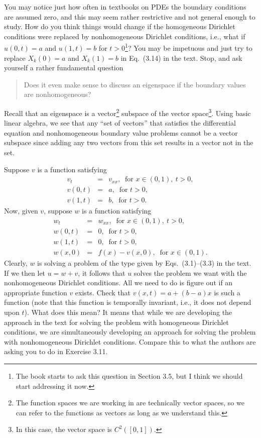 \documentclass{amsart}
\theoremstyle{plain}
\theoremstyle{definition}
\theoremstyle{remark}
\theoremstyle{definition}
\numberwithin{equation}{section}
\numberwithin{equation}{section}
\begin{document}
You may notice just how often in textbooks on PDEs the boundary conditions are assumed zero, and this may seem rather restrictive and not general enough to study.
How do you think things would change if the homogeneous Dirichlet conditions were replaced by nonhomogeneous Dirichlet conditions, i.e., what if $u(0,t)=a$ and $u(1,t)=b$ for $t>0$\footnote{The book starts to ask this question in Section 3.5, but I think we should start addressing it now.}?
You may be impetuous and just try to replace $X_k(0)=a$ and $X_k(1)=b$ in Eq.~(3.14) in the text.
Stop, and ask yourself a rather fundamental question
\begin{quote}
Does it even make sense to discuss an eigenspace if the boundary values are nonhomogeneous?
\end{quote}
Recall that an eigenspace is a vector\footnote{The function spaces we are working in are technically vector spaces, so we can refer to the functions as vectors as long as we understand this.} subspace of the vector space\footnote{In this case, the vector space is $C^2([0,1])$.}. 
Using basic linear algebra, we see that any ``set of vectors'' that satisfies the differential equation and nonhomogeneous boundary value problems cannot be a vector subspace since adding any two vectors from this set results in a vector not in the set.


Suppose $v$ is a function satisfying
\begin{eqnarray*}
	v_t &=& v_{xx}, \ \text{ for } x\in(0,1), \ t>0,\\
	v(0,t) &=& a, \ \text{ for } t>0, \\
	v(1,t) &=& b, \ \text{ for } t>0.
\end{eqnarray*}
Now, given $v$, suppose $w$ is a function satisfying
\begin{eqnarray*}
	w_t &=& w_{xx}, \ \text{ for } x\in(0,1), \ t>0,\\
	w(0,t) &=& 0, \ \text{ for } t>0, \\
	w(1,t) &=& 0, \ \text{ for } t>0, \\
	w(x,0) &=& f(x)-v(x,0), \ \text{ for } x\in(0,1).
\end{eqnarray*}
Clearly, $w$ is solving a problem of the type given by Eqs.~(3.1)--(3.3) in the text.
If we then let $u=w+v$, it follows that $u$ solves the problem we want with the nonhomogeneous Dirichlet conditions. 
All we need to do is figure out if an appropriate function $v$ exists. 
Check that $v(x,t)=a+(b-a)x$ is such a function (note that this function is temporally invariant, i.e., it does not depend upon $t$). 
What does this mean? 
It means that while we are developing the approach in the text for solving the problem with homogeneous Dirichlet conditions, we are simultaneously developing an approach for solving the problem with nonhomogeneous Dirichlet conditions. 
Compare this to what the authors are asking you to do in Exercise 3.11. 
\end{document}
